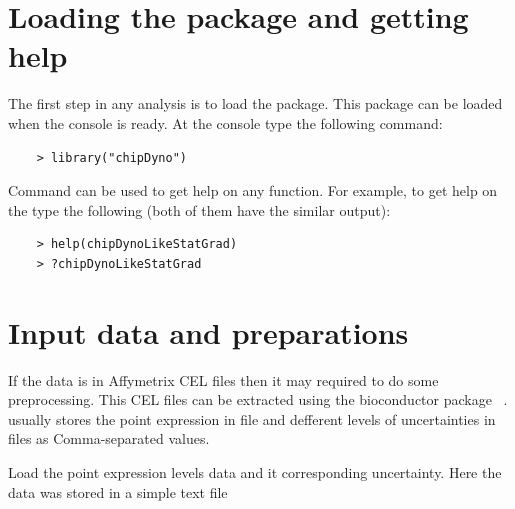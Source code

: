 \documentclass[11pt, a4paper, oneside]{article}
\begin{document}


\section{Loading the package and getting help}
The first step in any  analysis is to load the package. This package can be loaded when the \R{} console is ready. At the \R{} console type the following command:

\begin{verbatim}
    > library("chipDyno")
\end{verbatim}

Command  can be used to get help on any function. For example, to get help on the  type the following (both of them have the similar output):

\begin{verbatim}
    > help(chipDynoLikeStatGrad)
    > ?chipDynoLikeStatGrad
\end{verbatim}


\section{Input data and preparations}
If the data is in Affymetrix CEL files then it may required to do some preprocessing. This CEL files can be extracted using the bioconductor package  ~\cite{puma}.  usually stores the point expression in  file and defferent levels of uncertainties in  files as Comma-separated values.

Load the point expression levels data and it corresponding uncertainty. Here the data was stored in a simple text file %
\end{document}
